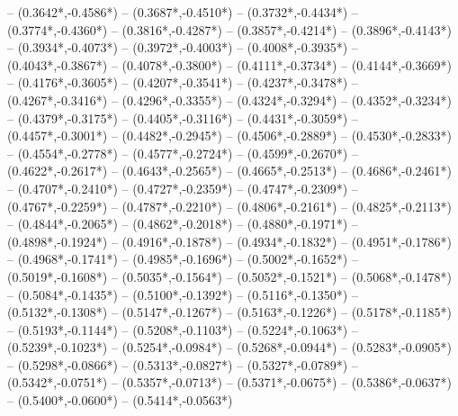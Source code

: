 {	-- ({0.3642*\dx},{-0.4586*\dy})
	-- ({0.3687*\dx},{-0.4510*\dy})
	-- ({0.3732*\dx},{-0.4434*\dy})
	-- ({0.3774*\dx},{-0.4360*\dy})
	-- ({0.3816*\dx},{-0.4287*\dy})
	-- ({0.3857*\dx},{-0.4214*\dy})
	-- ({0.3896*\dx},{-0.4143*\dy})
	-- ({0.3934*\dx},{-0.4073*\dy})
	-- ({0.3972*\dx},{-0.4003*\dy})
	-- ({0.4008*\dx},{-0.3935*\dy})
	-- ({0.4043*\dx},{-0.3867*\dy})
	-- ({0.4078*\dx},{-0.3800*\dy})
	-- ({0.4111*\dx},{-0.3734*\dy})
	-- ({0.4144*\dx},{-0.3669*\dy})
	-- ({0.4176*\dx},{-0.3605*\dy})
	-- ({0.4207*\dx},{-0.3541*\dy})
	-- ({0.4237*\dx},{-0.3478*\dy})
	-- ({0.4267*\dx},{-0.3416*\dy})
	-- ({0.4296*\dx},{-0.3355*\dy})
	-- ({0.4324*\dx},{-0.3294*\dy})
	-- ({0.4352*\dx},{-0.3234*\dy})
	-- ({0.4379*\dx},{-0.3175*\dy})
	-- ({0.4405*\dx},{-0.3116*\dy})
	-- ({0.4431*\dx},{-0.3059*\dy})
	-- ({0.4457*\dx},{-0.3001*\dy})
	-- ({0.4482*\dx},{-0.2945*\dy})
	-- ({0.4506*\dx},{-0.2889*\dy})
	-- ({0.4530*\dx},{-0.2833*\dy})
	-- ({0.4554*\dx},{-0.2778*\dy})
	-- ({0.4577*\dx},{-0.2724*\dy})
	-- ({0.4599*\dx},{-0.2670*\dy})
	-- ({0.4622*\dx},{-0.2617*\dy})
	-- ({0.4643*\dx},{-0.2565*\dy})
	-- ({0.4665*\dx},{-0.2513*\dy})
	-- ({0.4686*\dx},{-0.2461*\dy})
	-- ({0.4707*\dx},{-0.2410*\dy})
	-- ({0.4727*\dx},{-0.2359*\dy})
	-- ({0.4747*\dx},{-0.2309*\dy})
	-- ({0.4767*\dx},{-0.2259*\dy})
	-- ({0.4787*\dx},{-0.2210*\dy})
	-- ({0.4806*\dx},{-0.2161*\dy})
	-- ({0.4825*\dx},{-0.2113*\dy})
	-- ({0.4844*\dx},{-0.2065*\dy})
	-- ({0.4862*\dx},{-0.2018*\dy})
	-- ({0.4880*\dx},{-0.1971*\dy})
	-- ({0.4898*\dx},{-0.1924*\dy})
	-- ({0.4916*\dx},{-0.1878*\dy})
	-- ({0.4934*\dx},{-0.1832*\dy})
	-- ({0.4951*\dx},{-0.1786*\dy})
	-- ({0.4968*\dx},{-0.1741*\dy})
	-- ({0.4985*\dx},{-0.1696*\dy})
	-- ({0.5002*\dx},{-0.1652*\dy})
	-- ({0.5019*\dx},{-0.1608*\dy})
	-- ({0.5035*\dx},{-0.1564*\dy})
	-- ({0.5052*\dx},{-0.1521*\dy})
	-- ({0.5068*\dx},{-0.1478*\dy})
	-- ({0.5084*\dx},{-0.1435*\dy})
	-- ({0.5100*\dx},{-0.1392*\dy})
	-- ({0.5116*\dx},{-0.1350*\dy})
	-- ({0.5132*\dx},{-0.1308*\dy})
	-- ({0.5147*\dx},{-0.1267*\dy})
	-- ({0.5163*\dx},{-0.1226*\dy})
	-- ({0.5178*\dx},{-0.1185*\dy})
	-- ({0.5193*\dx},{-0.1144*\dy})
	-- ({0.5208*\dx},{-0.1103*\dy})
	-- ({0.5224*\dx},{-0.1063*\dy})
	-- ({0.5239*\dx},{-0.1023*\dy})
	-- ({0.5254*\dx},{-0.0984*\dy})
	-- ({0.5268*\dx},{-0.0944*\dy})
	-- ({0.5283*\dx},{-0.0905*\dy})
	-- ({0.5298*\dx},{-0.0866*\dy})
	-- ({0.5313*\dx},{-0.0827*\dy})
	-- ({0.5327*\dx},{-0.0789*\dy})
	-- ({0.5342*\dx},{-0.0751*\dy})
	-- ({0.5357*\dx},{-0.0713*\dy})
	-- ({0.5371*\dx},{-0.0675*\dy})
	-- ({0.5386*\dx},{-0.0637*\dy})
	-- ({0.5400*\dx},{-0.0600*\dy})
	-- ({0.5414*\dx},{-0.0563*\dy})
}
